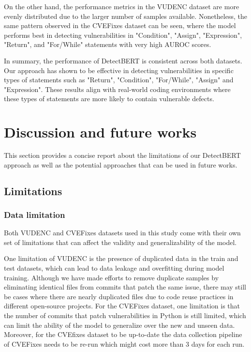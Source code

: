 \documentclass{ieeeaccess}
\begin{document}
\par On the other hand, the performance metrics in the VUDENC dataset are more evenly distributed due to the larger number of samples available. Nonetheless, the same pattern observed in the CVEFixes dataset can be seen, where the model performs  best in detecting vulnerabilities in "Condition", "Assign", "Expression", "Return", and "For/While" statements with very high AUROC scores.
\par In summary, the performance of DetectBERT is consistent across both datasets. Our approach has shown to be effective in detecting vulnerabilities in specific types of statements such as "Return", "Condition", "For/While", "Assign" and "Expression". These results align with real-world coding environments where these types of statements are more likely to contain vulnerable defects.

\section{Discussion and future works}
This section provides a concise report about the limitations of our DetectBERT approach as well as the potential approaches that can be used in future works.
\subsection{Limitations} \label{sec:limitation}

\subsubsection{Data limitation}
Both VUDENC and CVEFixes datasets used in this study come with their own set of limitations that can affect the validity and generalizability of the model.

\par One limitation of VUDENC is the presence of duplicated data in the train and test datasets, which can lead to data leakage and overfitting during model training. Although we have made efforts to remove duplicate samples by eliminating identical files from commits that patch the same issue, there may still be cases where there are nearly duplicated files due to code reuse practices in different open-source projects. For the  CVEFixes dataset, one limitation is that the number of commits that patch vulnerabilities in Python is still limited, which can limit the ability of the model to generalize over the new and unseen data. Moreover, for the CVEfixes dataset  to be up-to-date the data collection pipeline of CVEFixes  needs to be re-run which might cost more than 3 days for each run. 
\end{document}
